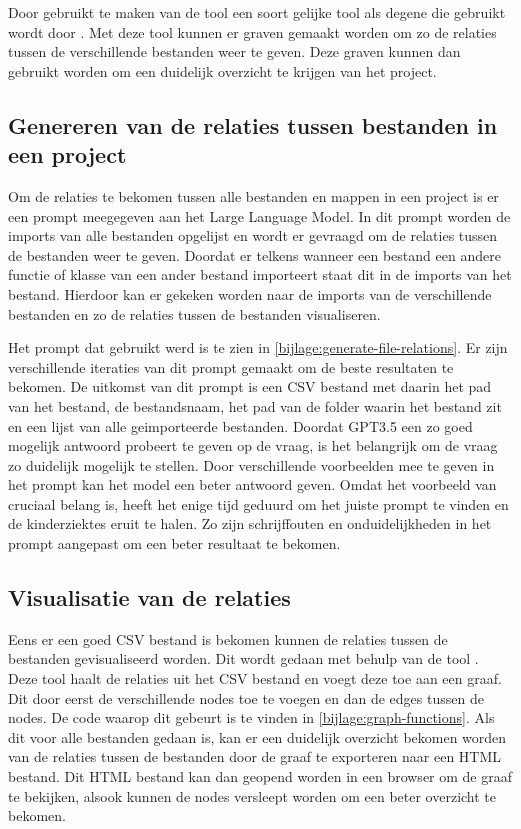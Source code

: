 Door gebruikt te maken van de tool \textcite{WHIR2018} een soort gelijke tool als degene die gebruikt wordt door \textcite{Doxygen2023}.
Met deze tool kunnen er graven gemaakt worden om zo de relaties tussen de verschillende bestanden weer te geven.
Deze graven kunnen dan gebruikt worden om een duidelijk overzicht te krijgen van het project.

\subsection{Genereren van de relaties tussen bestanden in een project}
\label{subsec:project-documentatie-relaties-genereren}

Om de relaties te bekomen tussen alle bestanden en mappen in een project is er een prompt meegegeven aan het Large Language Model.
In dit prompt worden de imports van alle bestanden opgelijst en wordt er gevraagd om de relaties tussen de bestanden weer te geven.
Doordat er telkens wanneer een bestand een andere functie of klasse van een ander bestand importeert staat dit in de imports van het bestand.
Hierdoor kan er gekeken worden naar de imports van de verschillende bestanden en zo de relaties tussen de bestanden visualiseren.

Het prompt dat gebruikt werd is te zien in \ref{bijlage:generate-file-relations}.
Er zijn verschillende iteraties van dit prompt gemaakt om de beste resultaten te bekomen.
De uitkomst van dit prompt is een CSV bestand met daarin het pad van het bestand, de bestandsnaam, het pad van de folder waarin het bestand zit en een lijst van alle geimporteerde bestanden.
Doordat GPT3.5 \autocite{OpenAI} een zo goed mogelijk antwoord probeert te geven op de vraag, is het belangrijk om de vraag zo duidelijk mogelijk te stellen.
Door verschillende voorbeelden mee te geven in het prompt kan het model een beter antwoord geven.
Omdat het voorbeeld van cruciaal belang is, heeft het enige tijd geduurd om het juiste prompt te vinden en de kinderziektes eruit te halen.
Zo zijn schrijffouten en onduidelijkheden in het prompt aangepast om een beter resultaat te bekomen.

\subsection{Visualisatie van de relaties}
\label{subsec:project-documentatie-relaties-visualisatie}

Eens er een goed CSV bestand is bekomen kunnen de relaties tussen de bestanden gevisualiseerd worden.
Dit wordt gedaan met behulp van de tool \textcite{WHIR2018}.
Deze tool haalt de relaties uit het CSV bestand en voegt deze toe aan een graaf. 
Dit door eerst de verschillende nodes toe te voegen en dan de edges tussen de nodes. 
De code waarop dit gebeurt is te vinden in \ref{bijlage:graph-functions}.
Als dit voor alle bestanden gedaan is, kan er een duidelijk overzicht bekomen worden van de relaties tussen de bestanden door de graaf te exporteren naar een HTML bestand.
Dit HTML bestand kan dan geopend worden in een browser om de graaf te bekijken, alsook kunnen de nodes versleept worden om een beter overzicht te bekomen.

